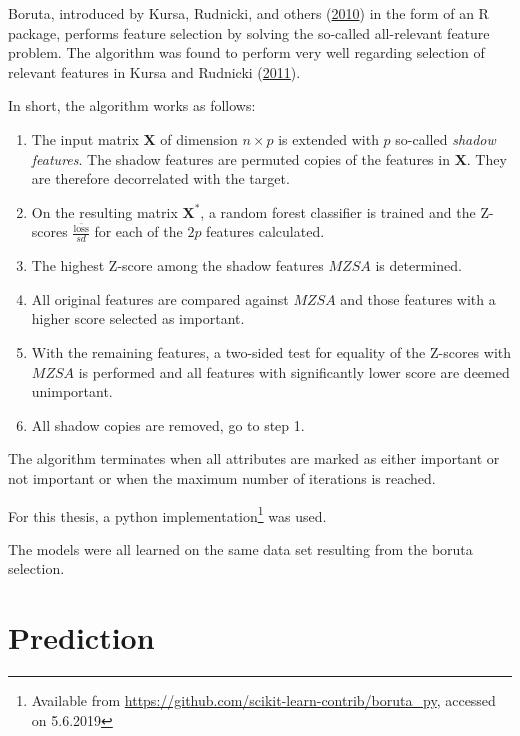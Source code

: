 \documentclass[
  11pt,
  a4paper,
  DIV=12,captions=tableheading,oneside,titlepage]{scrbook}
\providecommand{\tightlist}{%
  \setlength{\itemsep}{0pt}\setlength{\parskip}{0pt}}
\begin{document}
Boruta, introduced by Kursa, Rudnicki, and others (\protect\hyperlink{ref-kursa2010boruta}{2010}) in the form of an R package, performs feature selection by solving the so-called all-relevant feature problem. The algorithm was found to perform very well regarding selection of relevant features in Kursa and Rudnicki (\protect\hyperlink{ref-kursa2011boruta}{2011}).

In short, the algorithm works as follows:

\begin{enumerate}
\def\labelenumi{\arabic{enumi}.}
\tightlist
\item
  The input matrix \(\mathbf{X}\) of dimension \(n \times p\) is extended with \(p\) so-called \emph{shadow features}. The shadow features are permuted copies of the features in \(\mathbf{X}\). They are therefore decorrelated with the target.
\item
  On the resulting matrix \(\mathbf{X^*}\), a random forest classifier is trained and the Z-scores \(\frac{\bar{\text{loss}}}{sd}\) for each of the \(2p\) features calculated.
\item
  The highest Z-score among the shadow features \(MZSA\) is determined.
\item
  All original features are compared against \(MZSA\) and those features with a higher score selected as important.
\item
  With the remaining features, a two-sided test for equality of the Z-scores with \(MZSA\) is performed and all features with significantly lower score are deemed unimportant.
\item
  All shadow copies are removed, go to step 1.
\end{enumerate}

The algorithm terminates when all attributes are marked as either important or not important or when the maximum number of iterations is reached.

For this thesis, a python implementation\footnote{Available from \url{https://github.com/scikit-learn-contrib/boruta_py}, accessed on 5.6.2019} was used.

The models were all learned on the same data set resulting from the boruta selection.

\hypertarget{methods-prediction}{%
\section{Prediction}\label{methods-prediction}}
\end{document}
